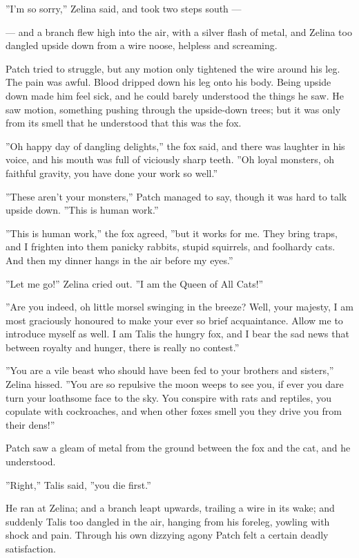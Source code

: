 \documentclass[12pt]{book}
\begin{document}
''I'm so sorry,'' Zelina said, and took two steps south ---

---
and a branch flew high into the air, with a silver flash of metal, and Zelina too dangled upside down from a wire noose, helpless and screaming.

Patch tried to struggle, but any motion only tightened the wire around his leg. The pain was awful. Blood dripped down his leg onto his body. Being upside down made him feel sick, and he could barely understood the things he saw. He saw motion, something pushing through the upside-down trees; but it was only from its smell that he understood that this was the fox.

''Oh happy day of dangling delights,'' the fox said, and there was laughter in his voice, and his mouth was full of viciously sharp teeth. ''Oh loyal monsters, oh faithful gravity, you have done your work so well.''

''These aren't your monsters,'' Patch managed to say, though it was hard to talk upside down. ''This is human work.''

''This is human work,'' the fox agreed, ''but it works for me. They bring traps, and I frighten into them panicky rabbits, stupid squirrels, and foolhardy cats. And then my dinner hangs in the air before my eyes.''

''Let me go!'' Zelina cried out. ''I am the Queen of All Cats!''

''Are you indeed, oh little morsel swinging in the breeze? Well, your majesty, I am most graciously honoured to make your ever so brief acquaintance. Allow me to introduce myself as well. I am Talis the hungry fox, and I bear the sad news that between royalty and hunger, there is really no contest.''

''You are a vile beast who should have been fed to your brothers and sisters,'' Zelina hissed. ''You are so repulsive the moon weeps to see you, if ever you dare turn your loathsome face to the sky. You conspire with rats and reptiles, you copulate with cockroaches, and when other foxes smell you they drive you from their dens!''

Patch saw a gleam of metal from the ground between the fox and the cat, and he understood.

''Right,'' Talis said, ''you die first.''

He ran at Zelina; and a branch leapt upwards, trailing a wire in its wake; and suddenly Talis too dangled in the air, hanging from his foreleg, yowling with shock and pain. Through his own dizzying agony Patch felt a certain deadly satisfaction.
\end{document}
